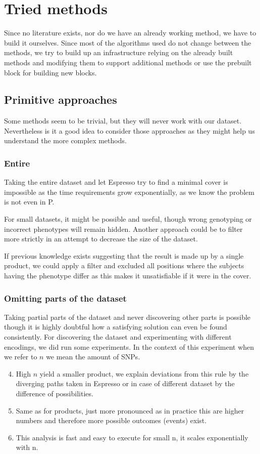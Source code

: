 \documentclass[letterpaper, 11pt]{article}
\begin{document}
\section{ Tried methods}
Since no literature exists, nor do we have an already working method, we have to build it ourselves. Since most of the algorithms used do not change between the methods, we try to build up an infrastructure relying on the already built methods and modifying them to support additional methods or use the prebuilt block for building new blocks. 
\subsection{Primitive approaches}
Some methods seem to be trivial, but they will never work with our dataset. Nevertheless is it a good idea to consider those approaches as they might help us understand the more complex methods.
\subsubsection{Entire}
Taking the entire dataset and let Espresso try to find a minimal cover is impossible as the time requirements grow exponentially, as we know the problem is not even in P. 

For small datasets, it might be possible and useful, though wrong genotyping or incorrect phenotypes will remain hidden. Another approach could be to filter more strictly in an attempt to decrease the size of the dataset.  

If previous knowledge exists suggesting that the result is made up by a single product, we could apply a filter and excluded all positions where the subjects having the phenotype differ as this makes it unsatisfiable if it were in the cover. 
\subsubsection{Omitting parts of the dataset}
\label{sec:omit}
Taking partial parts of the dataset and never discovering other parts is possible though it is highly doubtful how a satisfying solution can even be found consistently. For discovering the dataset and experimenting with different encodings, we did run some experiments. In the context of this experiment when we refer to $n$ we mean the amount of SNPs. 

\begin{enumerate} 
\setcounter{enumi}{3}
\item High $n$ yield a smaller product, we explain deviations from this rule by the diverging paths taken in Espresso or in case of different dataset by the difference of possibilities. 
\item Same as for products, just more pronounced as in practice this are higher numbers and therefore more possible outcomes (events) exist. 
\item This analysis is fast and easy to execute for small n, it scales exponentially with n. 
\end{enumerate}
\end{document}
